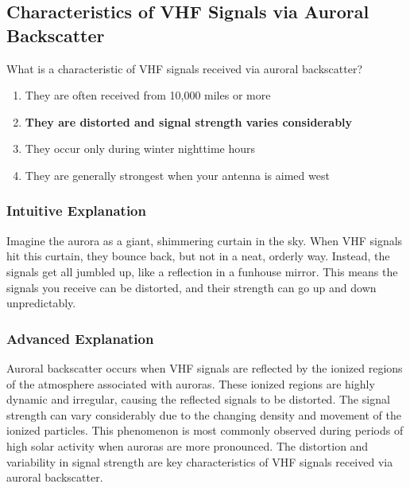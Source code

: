 \subsection{Characteristics of VHF Signals via Auroral Backscatter}
\label{T3C03}

\begin{tcolorbox}[colback=gray!10!white,colframe=black!75!black,title=T3C03]
What is a characteristic of VHF signals received via auroral backscatter?
\begin{enumerate}[noitemsep]
    \item They are often received from 10,000 miles or more
    \item \textbf{They are distorted and signal strength varies considerably}
    \item They occur only during winter nighttime hours
    \item They are generally strongest when your antenna is aimed west
\end{enumerate}
\end{tcolorbox}

\subsubsection*{Intuitive Explanation}
Imagine the aurora as a giant, shimmering curtain in the sky. When VHF signals hit this curtain, they bounce back, but not in a neat, orderly way. Instead, the signals get all jumbled up, like a reflection in a funhouse mirror. This means the signals you receive can be distorted, and their strength can go up and down unpredictably.

\subsubsection*{Advanced Explanation}
Auroral backscatter occurs when VHF signals are reflected by the ionized regions of the atmosphere associated with auroras. These ionized regions are highly dynamic and irregular, causing the reflected signals to be distorted. The signal strength can vary considerably due to the changing density and movement of the ionized particles. This phenomenon is most commonly observed during periods of high solar activity when auroras are more pronounced. The distortion and variability in signal strength are key characteristics of VHF signals received via auroral backscatter.
